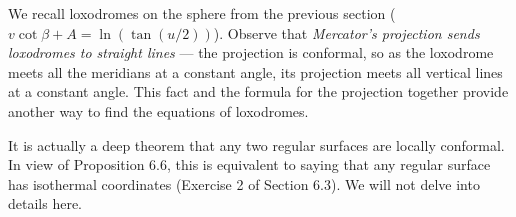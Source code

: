 \documentclass[leqno]{book}
\begin{document}
We recall loxodromes on the sphere from the previous section ($v\cot\beta+A=\ln(\tan(u/2))$).  Observe that \emph{Mercator's projection sends loxodromes to straight lines} \---- the projection is conformal, so as the loxodrome meets all the meridians at a constant angle, its projection meets all vertical lines at a constant angle.  This fact and the formula for the projection together provide another way to find the equations of loxodromes.

It is actually a deep theorem that any two regular surfaces are locally conformal.  In view of Proposition 6.6, this is equivalent to saying that any regular surface has isothermal coordinates (Exercise 2 of Section 6.3).  We will not delve into details here. %
\end{document}
